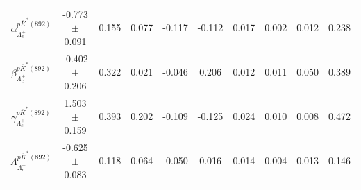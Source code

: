 \begin{table}[H]
{\begin{tabular}{c|c|ccccccc|c}
$\alpha_{\Lambda_c^+}^{p\overline{K}^*(892)}$ & -0.773$\pm$0.091 & 0.155 & 0.077 & -0.117 & -0.112 & 0.017 & 0.002 & 0.012 & 0.238\\
$\beta_{\Lambda_c^+}^{p\overline{K}^*(892)}$ & -0.402$\pm$0.206 & 0.322 & 0.021 & -0.046 & 0.206 & 0.012 & 0.011 & 0.050 & 0.389\\
$\gamma_{\Lambda_c^+}^{p\overline{K}^*(892)}$ & 1.503$\pm$0.159 & 0.393 & 0.202 & -0.109 & -0.125 & 0.024 & 0.010 & 0.008 & 0.472\\
$\Lambda_{\Lambda_c^+}^{p\overline{K}^*(892)}$ & -0.625$\pm$0.083 & 0.118 & 0.064 & -0.050 & 0.016 & 0.014 & 0.004 & 0.013 & 0.146\\
\hline\hline
\end{tabular}
}

\end{table}


